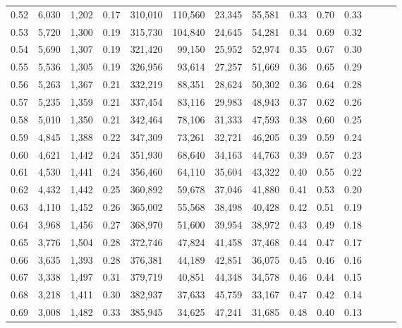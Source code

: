 \begin{tabular}{rrrrrrrrrrrrrr}
0.52 &   6,030 &  1,202 &  0.17 &  310,010 &  110,560 &  23,345 &  55,581 &  0.33 &  0.70 &      0.33 \\
0.53 &   5,720 &  1,300 &  0.19 &  315,730 &  104,840 &  24,645 &  54,281 &  0.34 &  0.69 &      0.32 \\
0.54 &   5,690 &  1,307 &  0.19 &  321,420 &   99,150 &  25,952 &  52,974 &  0.35 &  0.67 &      0.30 \\
0.55 &   5,536 &  1,305 &  0.19 &  326,956 &   93,614 &  27,257 &  51,669 &  0.36 &  0.65 &      0.29 \\
0.56 &   5,263 &  1,367 &  0.21 &  332,219 &   88,351 &  28,624 &  50,302 &  0.36 &  0.64 &      0.28 \\
0.57 &   5,235 &  1,359 &  0.21 &  337,454 &   83,116 &  29,983 &  48,943 &  0.37 &  0.62 &      0.26 \\
0.58 &   5,010 &  1,350 &  0.21 &  342,464 &   78,106 &  31,333 &  47,593 &  0.38 &  0.60 &      0.25 \\
0.59 &   4,845 &  1,388 &  0.22 &  347,309 &   73,261 &  32,721 &  46,205 &  0.39 &  0.59 &      0.24 \\
0.60 &   4,621 &  1,442 &  0.24 &  351,930 &   68,640 &  34,163 &  44,763 &  0.39 &  0.57 &      0.23 \\
0.61 &   4,530 &  1,441 &  0.24 &  356,460 &   64,110 &  35,604 &  43,322 &  0.40 &  0.55 &      0.22 \\
0.62 &   4,432 &  1,442 &  0.25 &  360,892 &   59,678 &  37,046 &  41,880 &  0.41 &  0.53 &      0.20 \\
0.63 &   4,110 &  1,452 &  0.26 &  365,002 &   55,568 &  38,498 &  40,428 &  0.42 &  0.51 &      0.19 \\
0.64 &   3,968 &  1,456 &  0.27 &  368,970 &   51,600 &  39,954 &  38,972 &  0.43 &  0.49 &      0.18 \\
0.65 &   3,776 &  1,504 &  0.28 &  372,746 &   47,824 &  41,458 &  37,468 &  0.44 &  0.47 &      0.17 \\
0.66 &   3,635 &  1,393 &  0.28 &  376,381 &   44,189 &  42,851 &  36,075 &  0.45 &  0.46 &      0.16 \\
0.67 &   3,338 &  1,497 &  0.31 &  379,719 &   40,851 &  44,348 &  34,578 &  0.46 &  0.44 &      0.15 \\
0.68 &   3,218 &  1,411 &  0.30 &  382,937 &   37,633 &  45,759 &  33,167 &  0.47 &  0.42 &      0.14 \\
0.69 &   3,008 &  1,482 &  0.33 &  385,945 &   34,625 &  47,241 &  31,685 &  0.48 &  0.40 &      0.13 \\

\end{tabular}
